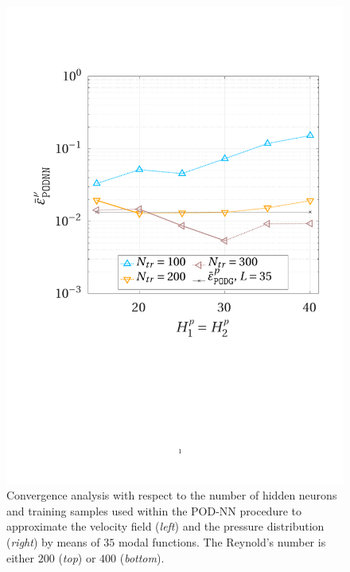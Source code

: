 \documentclass[12pt, a4paper, twoside, openright, notitlepage]{report}
\numberwithin{equation}{chapter}
\theoremstyle{theorem}
\theoremstyle{definition}
\theoremstyle{remark}
\theoremstyle{proposition}
\numberwithin{figure}{chapter}
\begin{document}
\begin{figure}[H]
			\includegraphics[scale = 0.37, trim = {1cm 9cm 1.5cm 3.5cm}, clip]{dc_400_p_nn_convergence}
			
			\vspace*{-0.1cm}
			
			\caption{Convergence analysis with respect to the number of hidden neurons and training samples used within the POD-NN procedure to approximate the velocity field (\emph{left}) and the pressure distribution (\emph{right}) by means of $35$ modal functions. The Reynold's number is either $200$ (\emph{top}) or $400$ (\emph{bottom}).}
			\label{fig:dc-nn-convergence}
		\end{figure}
		
		\vspace*{-0.2cm}
		
\end{document}
